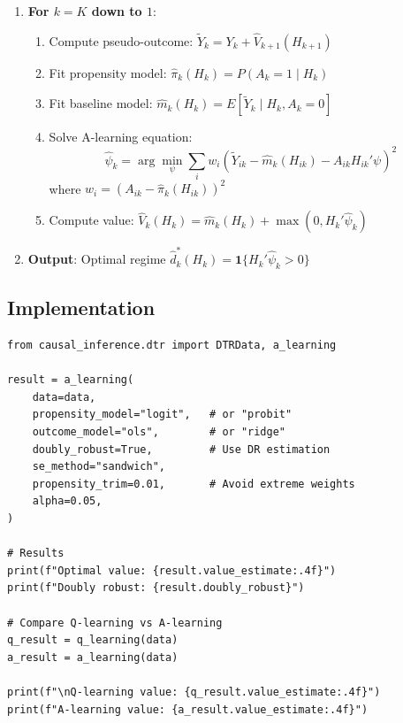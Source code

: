 \begin{algorithm}[A-Learning]
\label{alg:a-learning}
\begin{enumerate}
\item \textbf{For $k = K$ down to $1$}:
\begin{enumerate}
\item Compute pseudo-outcome: $\tilde{Y}_k = Y_k + \hat{V}_{k+1}(H_{k+1})$
\item Fit propensity model: $\hat{\pi}_k(H_k) = P(A_k = 1 \mid H_k)$
\item Fit baseline model: $\hat{m}_k(H_k) = E[\tilde{Y}_k \mid H_k, A_k = 0]$
\item Solve A-learning equation:
\begin{equation}
\hat{\psi}_k = \arg\min_\psi \sum_i w_i(\tilde{Y}_{ik} - \hat{m}_k(H_{ik}) - A_{ik} H_{ik}'\psi)^2
\end{equation}
where $w_i = (A_{ik} - \hat{\pi}_k(H_{ik}))^2$
\item Compute value: $\hat{V}_k(H_k) = \hat{m}_k(H_k) + \max(0, H_k'\hat{\psi}_k)$
\end{enumerate}
\item \textbf{Output}: Optimal regime $\hat{d}^*_k(H_k) = \mathbf{1}\{H_k'\hat{\psi}_k > 0\}$
\end{enumerate}
\end{algorithm}

\subsection{Implementation}

\begin{verbatim}
from causal_inference.dtr import DTRData, a_learning

result = a_learning(
    data=data,
    propensity_model="logit",   # or "probit"
    outcome_model="ols",        # or "ridge"
    doubly_robust=True,         # Use DR estimation
    se_method="sandwich",
    propensity_trim=0.01,       # Avoid extreme weights
    alpha=0.05,
)

# Results
print(f"Optimal value: {result.value_estimate:.4f}")
print(f"Doubly robust: {result.doubly_robust}")

# Compare Q-learning vs A-learning
q_result = q_learning(data)
a_result = a_learning(data)

print(f"\nQ-learning value: {q_result.value_estimate:.4f}")
print(f"A-learning value: {a_result.value_estimate:.4f}")
\end{verbatim}


